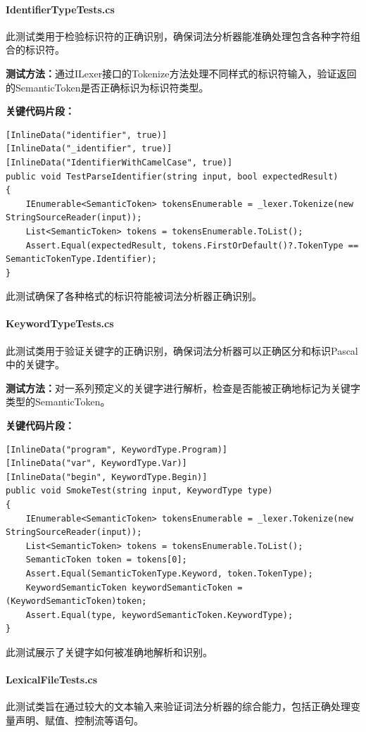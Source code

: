 \documentclass[../main.tex]{subfiles}
\begin{document}
\paragraph{IdentifierTypeTests.cs}
此测试类用于检验标识符的正确识别，确保词法分析器能准确处理包含各种字符组合的标识符。

\textbf{测试方法：}通过ILexer接口的Tokenize方法处理不同样式的标识符输入，验证返回的SemanticToken是否正确标识为标识符类型。

\textbf{关键代码片段：}
\begin{lstlisting}[style=csharp]
[InlineData("identifier", true)]
[InlineData("_identifier", true)]
[InlineData("IdentifierWithCamelCase", true)]
public void TestParseIdentifier(string input, bool expectedResult)
{
    IEnumerable<SemanticToken> tokensEnumerable = _lexer.Tokenize(new StringSourceReader(input));
    List<SemanticToken> tokens = tokensEnumerable.ToList();
    Assert.Equal(expectedResult, tokens.FirstOrDefault()?.TokenType == SemanticTokenType.Identifier);
}
\end{lstlisting}
此测试确保了各种格式的标识符能被词法分析器正确识别。

\paragraph{KeywordTypeTests.cs}
此测试类用于验证关键字的正确识别，确保词法分析器可以正确区分和标识Pascal中的关键字。

\textbf{测试方法：}对一系列预定义的关键字进行解析，检查是否能被正确地标记为关键字类型的SemanticToken。

\textbf{关键代码片段：}
\begin{lstlisting}[style=csharp]
[InlineData("program", KeywordType.Program)]
[InlineData("var", KeywordType.Var)]
[InlineData("begin", KeywordType.Begin)]
public void SmokeTest(string input, KeywordType type)
{
    IEnumerable<SemanticToken> tokensEnumerable = _lexer.Tokenize(new StringSourceReader(input));
    List<SemanticToken> tokens = tokensEnumerable.ToList();
    SemanticToken token = tokens[0];
    Assert.Equal(SemanticTokenType.Keyword, token.TokenType);
    KeywordSemanticToken keywordSemanticToken = (KeywordSemanticToken)token;
    Assert.Equal(type, keywordSemanticToken.KeywordType);
}
\end{lstlisting}
此测试展示了关键字如何被准确地解析和识别。

\paragraph{LexicalFileTests.cs}
此测试类旨在通过较大的文本输入来验证词法分析器的综合能力，包括正确处理变量声明、赋值、控制流等语句。
\end{document}
